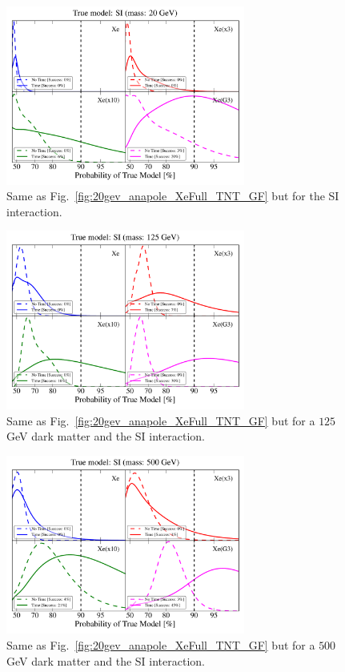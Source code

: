 \documentclass[11pt]{article}
\begin{document}
\begin{figure}
\centering
\includegraphics[width=0.7\textwidth]{plots/PDF_20GeV_SI_Higgs_50sims_Xe_Xe3x_Xe10x_XeG3_GF_TNT.pdf}
\caption{\label{fig:20gev_SI_Higgs_XeFull_TNT_GF}
Same as Fig.~\ref{fig:20gev_anapole_XeFull_TNT_GF} but for the SI interaction.}
\end{figure}


\begin{figure}
\centering
\includegraphics[width=0.7\textwidth]{plots/PDF_125GeV_SI_Higgs_50sims_Xe_Xe3x_Xe10x_XeG3_GF_TNT.pdf}
\caption{\label{fig:125gev_SI_Higgs_XeFull_TNT_GF}
Same as Fig.~\ref{fig:20gev_anapole_XeFull_TNT_GF} but for a $125$ GeV dark matter and the SI interaction.}
\end{figure}


\begin{figure}
\centering
\includegraphics[width=0.7\textwidth]{plots/PDF_500GeV_SI_Higgs_50sims_Xe_Xe3x_Xe10x_XeG3_GF_TNT.pdf}
\caption{\label{fig:500gev_SI_Higgs_XeFull_TNT_GF}
Same as Fig.~\ref{fig:20gev_anapole_XeFull_TNT_GF} but for a $500$ GeV dark matter and the SI interaction.}
\end{figure}



\end{document}

